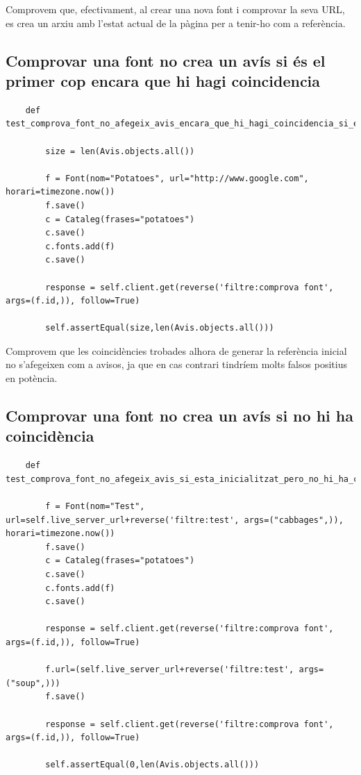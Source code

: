 \documentclass{article}
\begin{document}
Comprovem que, efectivament, al crear una nova font i comprovar la seva URL, es crea un arxiu amb l'estat actual de la pàgina per a tenir-ho com a referència.


\subsection{Comprovar una font no crea un avís si és el primer cop encara que hi hagi coincidencia}

\begin{lstlisting}
    def test_comprova_font_no_afegeix_avis_encara_que_hi_hagi_coincidencia_si_es_el_primer_cop(self):

        size = len(Avis.objects.all())

        f = Font(nom="Potatoes", url="http://www.google.com", horari=timezone.now())
        f.save()
        c = Cataleg(frases="potatoes")
        c.save()
        c.fonts.add(f)
        c.save()

        response = self.client.get(reverse('filtre:comprova font', args=(f.id,)), follow=True)

        self.assertEqual(size,len(Avis.objects.all()))
\end{lstlisting}

Comprovem que les coincidències trobades alhora de generar la referència inicial no s'afegeixen com a avisos, ja que en cas contrari tindríem molts falsos positius en potència.


\subsection{Comprovar una font no crea un avís si no hi ha coincidència}

\begin{lstlisting}
    def test_comprova_font_no_afegeix_avis_si_esta_inicialitzat_pero_no_hi_ha_coincidencia(self):

        f = Font(nom="Test", url=self.live_server_url+reverse('filtre:test', args=("cabbages",)), horari=timezone.now())
        f.save()
        c = Cataleg(frases="potatoes")
        c.save()
        c.fonts.add(f)
        c.save()

        response = self.client.get(reverse('filtre:comprova font', args=(f.id,)), follow=True)

        f.url=(self.live_server_url+reverse('filtre:test', args=("soup",)))
        f.save()

        response = self.client.get(reverse('filtre:comprova font', args=(f.id,)), follow=True)

        self.assertEqual(0,len(Avis.objects.all()))
\end{lstlisting}
\end{document}
